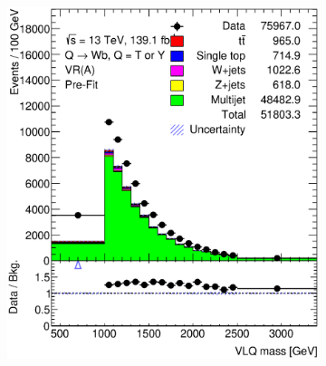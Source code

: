 \begin{figure}[hbt!]
\begin{subfigure}{.35\textwidth}
		\caption{}
		\label{fig:abcd:estimate:jet_pt}
	\end{subfigure}
	\begin{subfigure}{.35\textwidth}
		\centering
		\includegraphics[width=\linewidth,height=\textheight,keepaspectratio]{VR_B_VLQM.eps}
		\caption{}
		\label{fig:abcd:estimate:VLQM}
	\end{subfigure}\hspace{0.6cm}
	\begin{subfigure}{.35\textwidth}
		\centering

\end{subfigure}
\end{figure}
